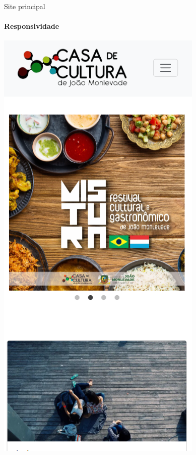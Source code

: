 \begin{frame}{Site principal}
    \framesubtitle{Responsividade}
    
        \begin{center}
            \includegraphics[height=\textheight]{beamerthemesrc/assets/responsividade1.png}

\end{center}
\end{frame}
